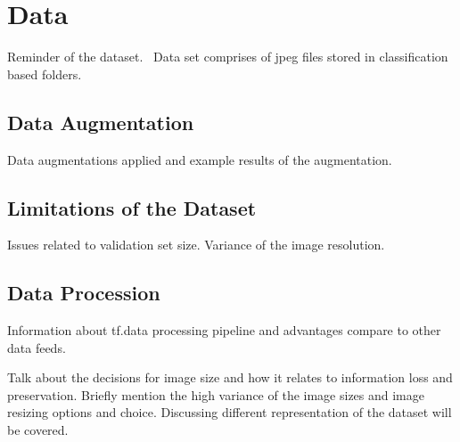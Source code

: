 \chapter{Data} \label{chap:data}
Reminder of the dataset.~\cite{openi} 
Data set comprises of jpeg files stored in classification based folders.

\section{Data Augmentation}
Data augmentations applied and example results of the augmentation.

\section{Limitations of the Dataset}
Issues related to validation set size. Variance of the image resolution.

\section{Data Procession}
Information about tf.data processing pipeline and advantages compare to other data feeds.

Talk about the decisions for image size and how it relates to information loss and preservation. Briefly mention the high variance of the image sizes and image resizing options and choice.
Discussing different representation of the dataset will be covered.
\clearpage
